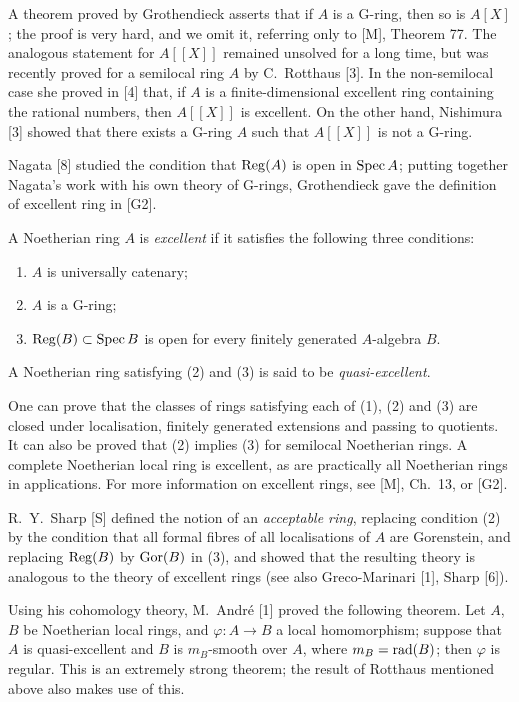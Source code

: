 A theorem proved by Grothendieck asserts that if $A$ is a G-ring, then so is
$A[X]$; the proof is very hard, and we omit it, referring only to [M], Theorem 77.
The analogous statement for $A[[X]]$ remained unsolved for a long time, but was
recently proved for a semilocal ring $A$ by C.~Rotthaus [3]. In the non-semilocal
case she proved in [4] that, if $A$ is a finite-dimensional excellent ring
containing the rational numbers, then $A[[X]]$ is excellent. On the other hand,
Nishimura [3] showed that there exists a G-ring $A$ such that $A[[X]]$ is not a
G-ring.

Nagata [8] studied the condition that $\operatorname{Reg}(A)$ is open in $\operatorname{Spec} A$; putting
together Nagata's work with his own theory of G-rings, Grothendieck gave the
definition of excellent ring in [G2].

\begin{definition*}
A Noetherian ring $A$ is \emph{excellent} if it satisfies the following three conditions:
\begin{enumerate}[(1)]
  \item $A$ is universally catenary;
  \item $A$ is a G-ring;
  \item $\operatorname{Reg}(B) \subset \operatorname{Spec} B$ is open for every finitely generated $A$-algebra $B$.
\end{enumerate}
A Noetherian ring satisfying (2) and (3) is said to be \emph{quasi-excellent}.
\end{definition*}

One can prove that the classes of rings satisfying each of (1), (2) and (3) are
closed under localisation, finitely generated extensions and passing to
quotients. It can also be proved that (2) implies (3) for semilocal Noetherian
rings. A complete Noetherian local ring is excellent, as are practically all
Noetherian rings in applications. For more information on excellent rings, see
[M], Ch.~13, or [G2].

R.~Y.~Sharp [S] defined the notion of an \emph{acceptable ring}, replacing condition
(2) by the condition that all formal fibres of all localisations of $A$ are
Gorenstein, and replacing $\operatorname{Reg}(B)$ by $\operatorname{Gor}(B)$ in (3), and showed that the
resulting theory is analogous to the theory of excellent rings (see also
Greco-Marinari [1], Sharp [6]).

Using his cohomology theory, M.~Andr\'e [1] proved the following theorem. Let
$A$, $B$ be Noetherian local rings, and $\varphi\colon A \to B$ a local homomorphism;
suppose that $A$ is quasi-excellent and $B$ is $m_B$-smooth over $A$, where
$m_B = \operatorname{rad}(B)$; then $\varphi$ is regular. This is an extremely strong theorem; the
result of Rotthaus mentioned above also makes use of this.
